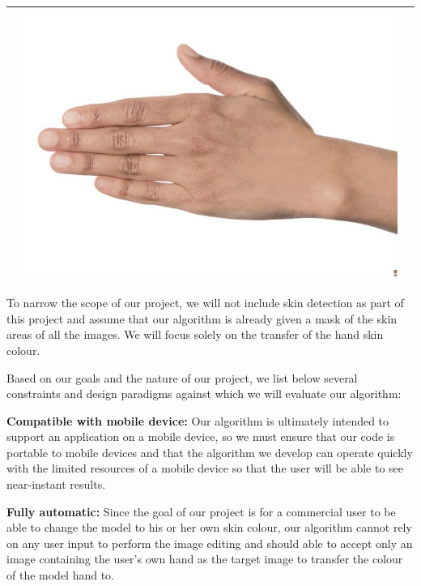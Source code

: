 \begin{table}[H]
\begin{tabular}{|c|c|c|}
\begin{minipage}{.29\textwidth}
	  \end{minipage} & 
	  \begin{minipage}{.29\textwidth}
	    \includegraphics[width=\textwidth,height=\textheight,keepaspectratio]{../rc_test/outputs/20170524_prop_corr_1p1_ave_100/hand_brown_to_hand_light.jpg}
	  \end{minipage} \\
	\hline
 \end{tabular}
 \end{table}

To narrow the scope of our project, we will not include skin detection as part of this project and assume that our algorithm is already given a mask of the skin areas of all the images. We will focus solely on the transfer of the hand skin colour. 

Based on our goals and the nature of our project, we list below several constraints and design paradigms against which we will evaluate our algorithm:

\textbf{Compatible with mobile device:} Our algorithm is ultimately intended to support an application on a mobile device, so we must ensure that our code is portable to mobile devices and that the algorithm we develop can operate quickly with the limited resources of a mobile device so that the user will be able to see near-instant results.

\textbf{Fully automatic:} Since the goal of our project is for a commercial user to be able to change the model to his or her own skin colour, our algorithm cannot rely on any user input to perform the image editing and should able to accept only an image containing the user's own hand as the target image to transfer the colour of the model hand to.

